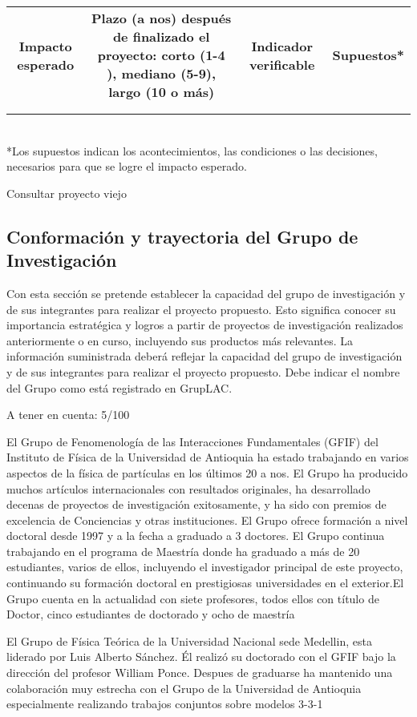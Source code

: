 \begin{tabular}{|c|c|c|c|}\hline
   \textbf{\parbox[t]{2cm}{\textbf{Impacto esperado}}}&\parbox[c]{4cm}{\textbf{Plazo (a nos) después de finalizado el proyecto: corto (1-4 ), mediano (5-9), largo (10 o más)}} & \textbf{\parbox[t]{2cm}{\textbf{Indicador verificable}}} &\textbf{Supuestos*}\\
   & & &\\\hline 
   & & &\\\hline
 \end{tabular}\\
*Los supuestos indican los acontecimientos, las condiciones o las decisiones,
necesarios para que se logre el impacto esperado.


Consultar proyecto viejo



\subsection{Conformación y trayectoria del Grupo de Investigación}
\begin{instrucciones}
  Con esta sección se pretende establecer la capacidad del grupo de
  investigación y de sus integrantes para realizar el proyecto
  propuesto. Esto significa conocer su importancia estratégica y
  logros a partir de proyectos de investigación realizados
  anteriormente o en curso, incluyendo sus productos más relevantes.
  La información suministrada deberá reflejar la capacidad del grupo
  de investigación y de sus integrantes para realizar el proyecto
  propuesto. Debe indicar el nombre del Grupo como está registrado en
  GrupLAC.
\end{instrucciones}
\begin{evaluacion}
  A tener en cuenta: 5/100
\end{evaluacion}
El Grupo de Fenomenología de las Interacciones Fundamentales (GFIF)
del Instituto de Física de la Universidad de Antioquia ha estado
trabajando en varios aspectos de la física de partículas en los
últimos 20 a nos. El Grupo ha producido muchos artículos
internacionales con resultados originales, ha desarrollado decenas de
proyectos de investigación exitosamente, y ha sido con premios de
excelencia de Conciencias y otras instituciones. El Grupo ofrece
formación a nivel doctoral desde 1997 y a la fecha a graduado a 3
doctores. El Grupo continua trabajando en el programa de Maestría
donde ha graduado a más de 20 estudiantes, varios de ellos, incluyendo
el investigador principal de este proyecto, continuando su formación
doctoral en prestigiosas universidades en el exterior.El Grupo cuenta
en la actualidad con siete profesores, todos ellos con título de
Doctor, cinco estudiantes de doctorado y ocho de maestría

El Grupo de Física Teórica de la Universidad Nacional sede Medellin,
esta liderado por Luis Alberto Sánchez. \'El realizó su doctorado con el
GFIF bajo la dirección del profesor William Ponce. Despues de
graduarse ha mantenido una colaboración muy estrecha con el Grupo de
la Universidad de Antioquia especialmente realizando trabajos
conjuntos sobre modelos 3-3-1

	

	